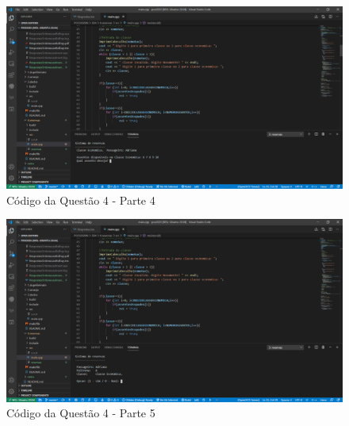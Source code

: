 \documentclass{article}
\begin{document}
\begin{figure}[h!]
  \includegraphics[scale=0.42]{reserva04.png}
  \caption{Código da Questão 4 - Parte 4}
\end{figure}
\begin{figure}[h!]
  \includegraphics[scale=0.42]{reserva05.png}
  \caption{Código da Questão 4 - Parte 5}
\end{figure}

\vspace{15mm}
\end{document}
